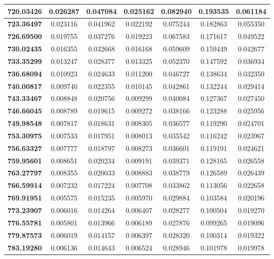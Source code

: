 \documentclass[10pt, a4paper]{article}
\begin{document}
\begin{appendices}
\begin{longtable}{|c|c|c|c|c|c|c|}
	\textbf{720.03426} & 0.026287 & 0.047084 & 0.025162 & 0.082940 & 0.193535 & 0.061184 \\ \hline
	\textbf{723.36497} & 0.023116 & 0.041962 & 0.022192 & 0.075244 & 0.182863 & 0.055350 \\ \hline
	\textbf{726.69500} & 0.019755 & 0.037276 & 0.019223 & 0.067583 & 0.171617 & 0.049522 \\ \hline
	\textbf{730.02435} & 0.016355 & 0.032668 & 0.016168 & 0.059609 & 0.159449 & 0.042677 \\ \hline
	\textbf{733.35299} & 0.013247 & 0.028377 & 0.013325 & 0.052370 & 0.147592 & 0.036934 \\ \hline
	\textbf{736.68094} & 0.010923 & 0.024633 & 0.011200 & 0.046727 & 0.138634 & 0.032350 \\ \hline
	\textbf{740.00817} & 0.009740 & 0.022355 & 0.010145 & 0.042861 & 0.132244 & 0.029414 \\ \hline
	\textbf{743.33467} & 0.008848 & 0.020756 & 0.009299 & 0.040084 & 0.127367 & 0.027450 \\ \hline
	\textbf{746.66045} & 0.008789 & 0.019615 & 0.009272 & 0.038166 & 0.123288 & 0.025956 \\ \hline
	\textbf{749.98548} & 0.007817 & 0.018631 & 0.008305 & 0.036577 & 0.119290 & 0.024701 \\ \hline
	\textbf{753.30975} & 0.007533 & 0.017951 & 0.008013 & 0.035542 & 0.116242 & 0.023967 \\ \hline
	\textbf{756.63327} & 0.007777 & 0.018797 & 0.008273 & 0.036601 & 0.119191 & 0.024621 \\ \hline
	\textbf{759.95601} & 0.008651 & 0.020234 & 0.009191 & 0.039371 & 0.128165 & 0.026558 \\ \hline
	\textbf{763.27797} & 0.008355 & 0.020033 & 0.008883 & 0.038779 & 0.126589 & 0.026439 \\ \hline
	\textbf{766.59914} & 0.007232 & 0.017224 & 0.007708 & 0.033862 & 0.113056 & 0.022658 \\ \hline
	\textbf{769.91951} & 0.005575 & 0.015235 & 0.005970 & 0.029884 & 0.103584 & 0.020196 \\ \hline
	\textbf{773.23907} & 0.006016 & 0.014264 & 0.006407 & 0.028277 & 0.100504 & 0.019270 \\ \hline
	\textbf{776.55781} & 0.005801 & 0.013966 & 0.006189 & 0.027876 & 0.099265 & 0.019096 \\ \hline
	\textbf{779.87573} & 0.006019 & 0.014157 & 0.006397 & 0.028320 & 0.100314 & 0.019322 \\ \hline
	\textbf{783.19280} & 0.006136 & 0.014643 & 0.006524 & 0.028946 & 0.101978 & 0.019978 \\ \hline

\end{longtable}
\end{appendices}
\end{document}
